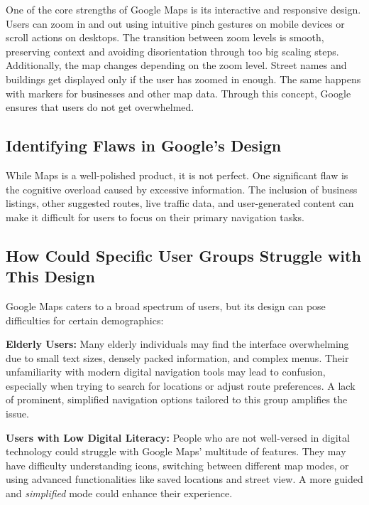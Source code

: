\blankLine

One of the core strengths of Google Maps is its interactive and responsive design. Users can zoom in and out using intuitive pinch gestures on mobile devices or scroll actions on desktops. The transition between zoom levels is smooth, preserving context and avoiding disorientation through too big scaling steps. Additionally, the map changes depending on the zoom level. Street names and buildings get displayed only if the user has zoomed in enough. The same happens with markers for businesses and other map data. Through this concept, Google ensures that users do not get overwhelmed. \autocite{battersby2008user}

\blankLine

\subsection{Identifying Flaws in Google's Design}

While Maps is a well-polished product, it is not perfect. One significant flaw is the cognitive overload caused by excessive information. The inclusion of business listings, other suggested routes, live traffic data, and user-generated content can make it difficult for users to focus on their primary navigation tasks. \autocite{battersby2008user}

\blankLine

\subsection{How Could Specific User Groups Struggle with This Design}

Google Maps caters to a broad spectrum of users, but its design can pose difficulties for certain demographics:
\blankLine

\textbf{Elderly Users:} Many elderly individuals may find the interface overwhelming due to small text sizes, densely packed information, and complex menus. Their unfamiliarity with modern digital navigation tools may lead to confusion, especially when trying to search for locations or adjust route preferences. A lack of prominent, simplified navigation options tailored to this group amplifies the issue. \autocite{allyant2022google}

\textbf{Users with Low Digital Literacy:} People who are not well-versed in digital technology could struggle with Google Maps' multitude of features. They may have difficulty understanding icons, switching between different map modes, or using advanced functionalities like saved locations and street view. A more guided and \textit{simplified} mode could enhance their experience.

